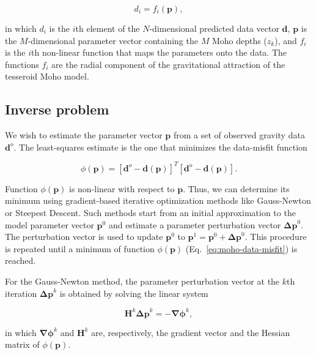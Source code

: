 \begin{equation}
    d_i = f_i(\mathbf{p}),
    \label{eq:moho-forward}
\end{equation}

\noindent in which $d_i$ is the $i$th element of the $N$-dimensional predicted
data vector $\mathbf{d}$, $\mathbf{p}$ is the $M$-dimensional parameter vector
containing the $M$ Moho depths ($z_k$),
and $f_i$ is the $i$th non-linear function that maps the parameters onto the
data.
The functions $f_i$ are the radial component of the gravitational attraction
of the tesseroid Moho model.



\subsection{Inverse problem}

We wish to estimate the parameter vector $\mathbf{p}$ from a set of observed
gravity data $\mathbf{d}^o$.
The least-squares estimate is the one that minimizes the data-misfit function

\begin{equation}
    \phi(\mathbf{p}) =
        [\mathbf{d}^o - \mathbf{d}(\mathbf{p})]^T
        [\mathbf{d}^o - \mathbf{d}(\mathbf{p})].
    \label{eq:moho-data-misfit}
\end{equation}

Function $\phi(\mathbf{p})$ is non-linear with respect to $\mathbf{p}$.
Thus, we can determine its minimum using gradient-based
iterative optimization
methods like Gauss-Newton or Steepest Descent.
Such methods start from an initial approximation to the model parameter vector
$\mathbf{p}^0$ and estimate a parameter perturbation vector
$\mathbf{\Delta p}^0$.
The perturbation vector is used to update $\mathbf{p}^0$ to
$\mathbf{p}^1 =  \mathbf{p}^0 + \mathbf{\Delta p}^0$.
This procedure is repeated until a minimum of function $\phi(\mathbf{p})$
(Eq.~\ref{eq:moho-data-misfit}) is reached.

For the Gauss-Newton method,
the parameter perturbation vector at the $k$th iteration $\mathbf{\Delta p}^k$
is obtained by solving the linear system

\begin{equation}
    \mathbf{H}^k\mathbf{\Delta p}^k = -\mathbf{\nabla\phi}^k,
    \label{eq:moho-gaussnewton}
\end{equation}

\noindent in which
$\mathbf{\nabla\phi}^k$ and $\mathbf{H}^k$ are, respectively,
the gradient vector and the Hessian matrix of $\phi(\mathbf{p})$.

